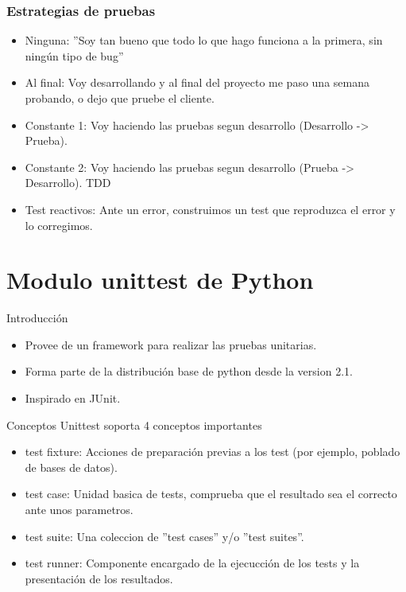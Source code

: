\documentclass[10pt]{beamer}
\begin{document}
  \begin{frame}
    \frametitle{Estrategias de pruebas}
    \begin{itemize}
      \item Ninguna: ''Soy tan bueno que todo lo que hago funciona a la primera, sin ningún tipo de bug''
      \item Al final: Voy desarrollando y al final del proyecto me paso una semana probando, o dejo que pruebe el cliente.
      \item Constante 1: Voy haciendo las pruebas segun desarrollo (Desarrollo -> Prueba).
      \item Constante 2: Voy haciendo las pruebas segun desarrollo (Prueba -> Desarrollo). TDD
      \item Test reactivos: Ante un error, construimos un test que reproduzca el error y lo corregimos.
    \end{itemize}
  \end{frame}
  
  \section*{Modulo unittest de Python}
  \begin{frame}{Introducción}
    \begin{itemize}
      \item Provee de un framework para realizar las pruebas unitarias.
      \item Forma parte de la distribución base de python desde la version 2.1.
      \item Inspirado en JUnit.
    \end{itemize}
  \end{frame}

  \begin{frame}{Conceptos}
    Unittest soporta 4 conceptos importantes
    \begin{itemize}
      \item test fixture: Acciones de preparación previas a los test (por ejemplo, poblado de bases de datos).
      \item test case: Unidad basica de tests, comprueba que el resultado sea el correcto ante unos parametros.
      \item test suite: Una coleccion de ''test cases'' y/o ''test suites''.
      \item test runner: Componente encargado de la ejecucción de los tests y la presentación de los resultados.
    \end{itemize}
  \end{frame}
\end{document}

